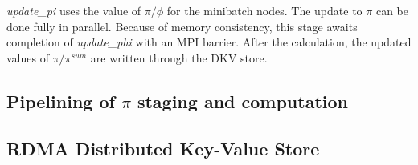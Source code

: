 \textit{update\_pi} uses the value of $\pi/\phi$ for the minibatch nodes. The
update to $\pi$ can be done fully in parallel. Because of memory consistency,
this stage awaits completion of \textit{update\_phi} with an MPI barrier.
After the calculation, the updated values of $\pi/\pi^{sum}$ are written
through the DKV store.

\subsection{Pipelining of $\pi$ staging and computation}

\subsection{RDMA Distributed Key-Value Store}
